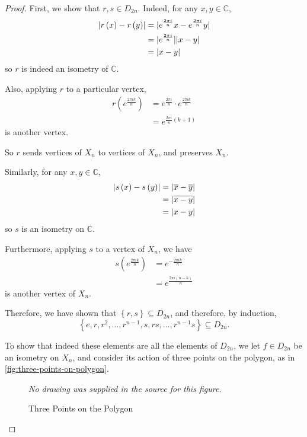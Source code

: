 \documentclass{article}
\theoremstyle{definition}
\theoremstyle{remark}
\DeclarePairedDelimiter{\abs}{\lvert}{\rvert}
\newcommand{\pqty}[1]{\left(#1\right)}
\newcommand{\Bqty}[1]{\left\{#1\right\}}
\newcommand{\conjugate}[1]{\overline{#1}}
\newcommand{\CC}{\mathbb{C}}
\begin{document}
\begin{proof}
    First, we show that \(r, s \in D_{2n}\). Indeed, for any \(x, y \in \CC\),
    \begin{align*}
        \abs{r\pqty{x} - r\pqty{y}} &= \abs{e^{\frac{2 \pi i}{n}} x - e^{\frac{2 \pi i}{n}} y} \\
        &= \abs{e^{\frac{2 \pi i}{n}}} \abs{x - y} \\
        &= \abs{x - y}
    \end{align*}
    so \(r\) is indeed an isometry of \(\CC\).

    Also, applying \(r\) to a particular vertex,
    \begin{align*}
        r\pqty{e^{\frac{2 \pi i k}{n}}} &= e^{\frac{2 \pi i}{n}} \cdot e^{\frac{2 \pi i k}{n}} \\
        &= e^{\frac{2 \pi i}{n} \pqty{k + 1}}
    \end{align*}
    is another vertex.

    So \(r\) sends vertices of \(X_n\) to vertices of \(X_n\), and preserves \(X_n\).

    Similarly, for any \(x, y \in \CC\),
    \begin{align*}
        \abs{s \pqty{x} - s \pqty{y}} &= \abs{\conjugate{x} - \conjugate{y}} \\
        &= \abs{\conjugate{x - y}} \\
        &= \abs{x - y}
    \end{align*}
    so \(s\) is an isometry on \(\CC\).

    Furthermore, applying \(s\) to a vertex of \(X_n\), we have
    \begin{align*}
        s\pqty{e^{\frac{2 \pi i k}{n}}} &= e^{- \frac{2 \pi i k}{n}} \\
        &= e^{\frac{2 \pi i \pqty{n - k}}{n}}
    \end{align*}
    is another vertex of \(X_n\).

    Therefore, we have shown that \(\Bqty{r, s} \subseteq D_{2n}\), and therefore, by induction,
    \[\Bqty{e, r, r^2, \ldots, r^{n - 1}, s, rs, \ldots, r^{n - 1} s} \subseteq D_{2n}.\]

    To show that indeed these elements are all the elements of \(D_{2n}\), we let \(f \in D_{2n}\) be an isometry on \(X_n\), and consider its action of three points on the polygon, as in \autoref{fig:three-points-on-polygon}.

    \begin{figure}[ht!]
        \centering
        \emph{No drawing was supplied in the source for this figure.}\par
\caption{Three Points on the Polygon}
        \label{fig:three-points-on-polygon}
    \end{figure}


\end{proof}
\end{document}
